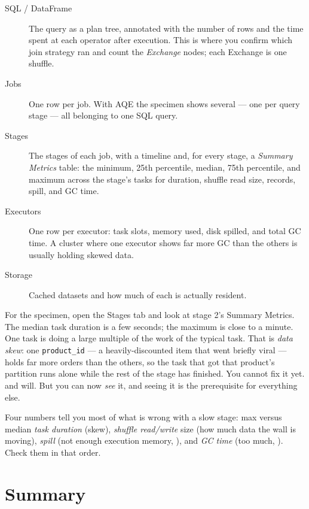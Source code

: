 \begin{description}
  \item[SQL / DataFrame] The query as a plan tree, annotated with the number of
        rows and the time spent at each operator after execution. This is where
        you confirm which join strategy ran and count the \emph{Exchange} nodes;
        each Exchange is one shuffle.
  \item[Jobs] One row per job. With AQE the specimen shows several --- one per
        query stage --- all belonging to one SQL query.
  \item[Stages] The stages of each job, with a timeline and, for every stage, a
        \emph{Summary Metrics} table: the minimum, 25th percentile, median, 75th
        percentile, and maximum across the stage's tasks for duration, shuffle
        read size, records, spill, and GC time.
  \item[Executors] One row per executor: task slots, memory used, disk spilled,
        and total GC time. A cluster where one executor shows far more GC than
        the others is usually holding skewed data.
  \item[Storage] Cached datasets and how much of each is actually resident.
\end{description}

For the specimen, open the Stages tab and look at stage 2's Summary Metrics. The
median task duration is a few seconds; the maximum is close to a minute. One task
is doing a large multiple of the work of the typical task. That is \emph{data
skew}: one \texttt{product\_id} --- a heavily-discounted item that went briefly
viral --- holds far more orders than the others, so the task that got that
product's partition runs alone while the rest of the stage has finished. You
cannot fix it yet.  and
 will. But you can now \emph{see} it, and seeing it is the
prerequisite for everything else.

\begin{tip}
Four numbers tell you most of what is wrong with a slow stage: max versus median
\emph{task duration} (skew), \emph{shuffle read/write} size (how much data the
wall is moving), \emph{spill} (not enough execution memory, ),
and \emph{GC time} (too much, ). Check them in that order.
\end{tip}

\section{Summary}
\label{sec:shape-summary}

